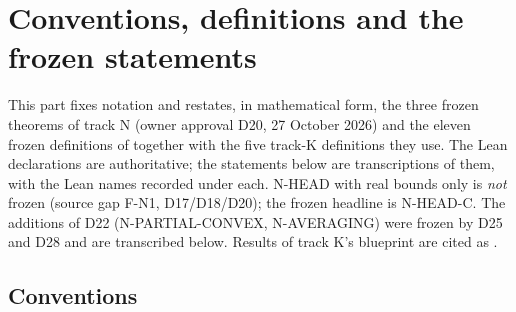 \section{Conventions, definitions and the frozen statements}\label{bpN:p0}

This part fixes notation and restates, in mathematical form, the three frozen theorems of track N
(owner approval D20, 27 October 2026) and the eleven frozen definitions of
\texttt{} together with the five track-K definitions they use. The Lean
declarations are authoritative; the statements below are transcriptions of them, with the Lean names
recorded under each. N-HEAD with real bounds only is \emph{not} frozen (source gap F-N1, D17/D18/D20); the
frozen headline is N-HEAD-C. The additions of D22 (N-PARTIAL-CONVEX, N-AVERAGING) were frozen by D25 and D28 and are transcribed below. Results of track K's blueprint are cited as .

\subsection{Conventions}\label{bpN:p0:conventions}

